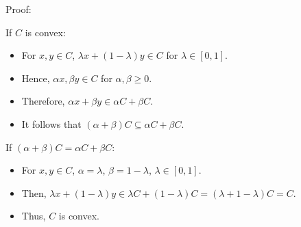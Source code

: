 \documentclass{exam}
\begin{document}
\begin{questions}

Proof:

If \( C \) is convex:
\begin{itemize}
    \item For \( x, y \in C \), \( \lambda x + (1-\lambda)y \in C \) for \( \lambda \in [0,1] \).
    \item Hence, \( \alpha x, \beta y \in C \) for \( \alpha, \beta \geq 0 \).
    \item Therefore, \( \alpha x + \beta y \in \alpha C + \beta C \).
    \item It follows that \( (\alpha + \beta)C \subseteq \alpha C + \beta C \).
\end{itemize}

If \( (\alpha + \beta)C = \alpha C + \beta C \):
\begin{itemize}
    \item For \( x, y \in C \), \( \alpha = \lambda \), \( \beta = 1-\lambda \), \( \lambda \in [0,1] \).
    \item Then, \( \lambda x + (1-\lambda)y \in \lambda C + (1-\lambda)C = (\lambda + 1 - \lambda)C = C \).
    \item Thus, \( C \) is convex.
\end{itemize}

\end{questions}
\end{document}
